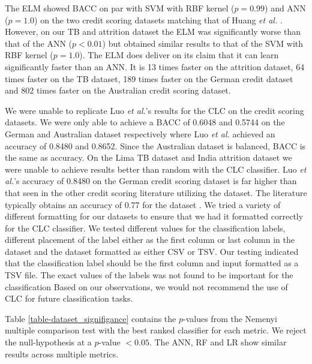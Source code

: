 \documentclass{sig-alternate-05-2015}
\begin{document}
	The ELM showed BACC on par with SVM with RBF kernel ($p=0.99$) and ANN ($p=1.0$) on the two credit scoring datasets matching that of Huang \textit{et al.} \cite{6035797, Huang2006489}. However, on our TB and attrition dataset the ELM was significantly worse than that of the ANN ($p<0.01$) but obtained similar results to that of the SVM with RBF kernel ($p=1.0$). The ELM does deliver on its claim that it can learn significantly faster than an ANN. It is 13 times faster on the attrition dataset, 64 times faster on the TB dataset, 189 times faster on the German credit dataset and 802 times faster on the Australian credit scoring dataset.
	
	We were unable to replicate Luo \textit{et al.}'s \cite{Luo20097562} results for the CLC on the credit scoring datasets. We were only able to achieve a BACC of 0.6048 and 0.5744 on the German and Australian dataset respectively where Luo \textit{et al.} achieved an accuracy of 0.8480 and 0.8652. Since the Australian dataset is balanced, BACC is the same as accuracy. On the Lima TB dataset and India attrition dataset we were unable to achieve results better than random with the CLC classifier. Luo \textit{et al.}'s accuracy of 0.8480 on the German credit scoring dataset is far higher than that seen in the other credit scoring literature utilizing the dataset. The literature typically obtains an accuracy of 0.77 for the dataset \cite{Huang2007847, Nanni20093028, Tsai20082639, Wang2011223}. We tried a variety of different formatting for our datasets to ensure that we had it formatted correctly for the CLC classifier. We tested different values for the classification labels, different placement of the label either as the first column or last column in the dataset and the dataset formatted as either CSV or TSV. Our testing indicated that the classification label should be the first column and input formatted as a TSV file. The exact values of the labels was not found to be important for the classification Based on our observations, we would not recommend the use of CLC for future classification tasks.	
	
	Table \ref{table-dataset_signifigance} contains the $p$-values from the Nemenyi multiple comparison test with the best ranked classifier for each metric. We reject the null-hypothesis at a $p$-value $< 0.05$. The ANN, RF and LR show similar results across multiple metrics.
	
\end{document}
